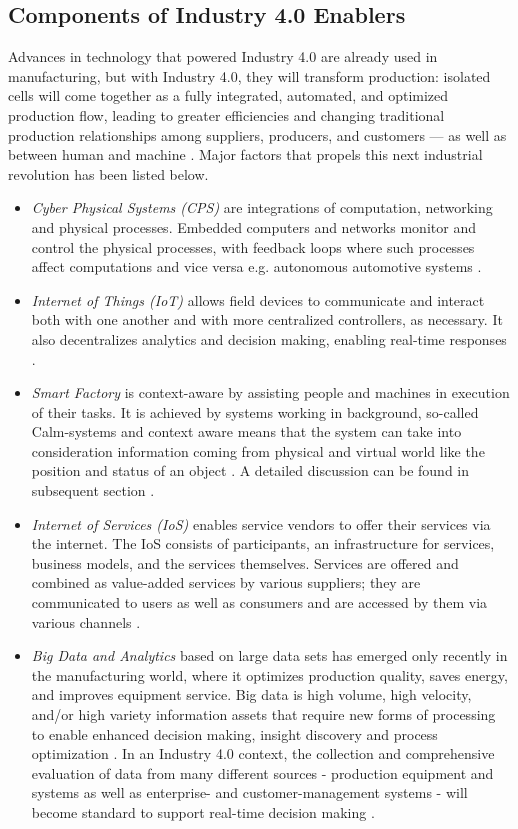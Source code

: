 \subsection{Components of Industry 4.0 Enablers}
Advances in technology that powered Industry 4.0 are already used in manufacturing, but with Industry 4.0, they will transform production: isolated cells will come together as a fully integrated, automated, and optimized production flow, leading to greater efficiencies and changing traditional production relationships among suppliers, producers, and customers — as well as between human and machine \cite{IN4BCG}. Major factors that propels this next industrial revolution has been listed below.
\begin{itemize}
\item \textit{Cyber Physical Systems (\acs{CPS})}  are integrations of computation, networking and physical processes. Embedded computers and networks monitor and control the physical processes, with feedback loops where such processes affect computations and vice versa e.g. autonomous automotive systems \cite{IN4DESIGN}.
\item \textit{Internet of Things (\acs{IoT})}  allows field devices to communicate and interact both with one another and with more centralized controllers, as necessary. It also decentralizes analytics and decision making, enabling real-time responses \cite{IN4BCG,IN4DESIGN}.
\item \textit{Smart Factory} is context-aware by assisting people and machines in execution of their tasks. It is achieved by systems working in background, so-called Calm-systems and context aware means that the system can take into consideration information coming 	from physical and virtual world like the position and status of an object \cite{IN4DESIGN}. A detailed discussion can be found in subsequent section .
\item \textit{Internet of Services (\acs{IoS})} enables service vendors to offer their services via the internet. The \acs{IoS} consists of participants, an infrastructure for services, business models, and the services themselves. Services are offered and combined as value-added services by various suppliers; they are communicated to users as well as consumers and are accessed by them via various channels \cite{IN4DESIGN}.
\item \textit{Big Data and Analytics} based on large data sets has emerged only recently in the manufacturing world, where it optimizes production quality, saves energy, and improves equipment service. Big data is high volume, high velocity, and/or high variety information assets that require new forms of processing to enable enhanced decision making, insight discovery and process optimization \cite{BIGDATA}. In an Industry 4.0 context, the collection and comprehensive evaluation of data from many different sources - production equipment and systems as well as enterprise- and customer-management systems - will become standard to support real-time decision making \cite{IN4BCG,IN4DESIGN}.

\end{itemize}
